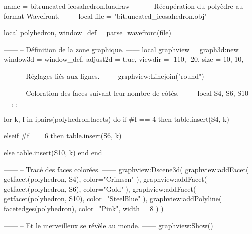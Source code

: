 \documentclass{standalone}
\begin{document}
\begin{luadraw}{name = bitruncated-icosahedron.luadraw}
------
-- Récupération du polyèdre au format Wavefront.
------
local file = "bitruncated_icosahedron.obj"

local polyhedron, window_def = parse_wavefront(file)

------
-- Définition de la zone graphique.
------
local graphview = graph3d:new{
  window3d = window_def,
  adjust2d = true,
  viewdir  = {-110, -20},
  size     = {10, 10},
}

------
-- Réglages liés aux lignes.
------
graphview:Linejoin("round")

------
-- Coloration des faces suivant leur nombre de côtés.
------
local S4, S6, S10 = {}, {}, {}

for k, f in ipairs(polyhedron.facets) do
  if #f == 4 then
    table.insert(S4, k)

  elseif #f == 6 then
    table.insert(S6, k)

  else
    table.insert(S10, k)
  end
end

------
-- Tracé des faces colorées.
------
graphview:Dscene3d(
  graphview:addFacet(
    getfacet(polyhedron, S4),
    {
      color="Crimson"
    }),
  graphview:addFacet(
    getfacet(polyhedron, S6),
    {
      color="Gold"
    }),
  graphview:addFacet(
    getfacet(polyhedron, S10),
    {
      color="SteelBlue"
    }),
  graphview:addPolyline(
    facetedges(polyhedron),
    {
      color="Pink",
      width = 8
    })
)

------
-- Et le merveilleux se révèle au monde.
------
graphview:Show()
\end{luadraw}
\end{document}
